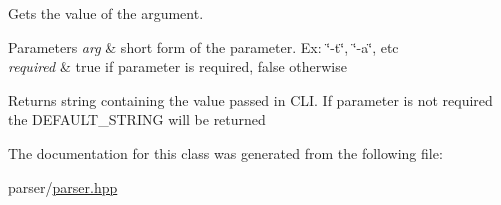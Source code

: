 Gets the value of the argument. 


\begin{DoxyParams}{Parameters}
{\em arg} & short form of the parameter. Ex\+: \char`\"{}-\/t\char`\"{}, \char`\"{}-\/a\char`\"{}, etc \\
\hline
{\em required} & true if parameter is required, false otherwise \\
\hline
\end{DoxyParams}
\begin{DoxyReturn}{Returns}
string containing the value passed in C\+L\+I. If parameter is not required the D\+E\+F\+A\+U\+L\+T\+\_\+\+S\+T\+R\+I\+N\+G will be returned 
\end{DoxyReturn}


The documentation for this class was generated from the following file\+:\begin{DoxyCompactItemize}
\item 
parser/\hyperlink{parser_8hpp}{parser.\+hpp}\end{DoxyCompactItemize}
